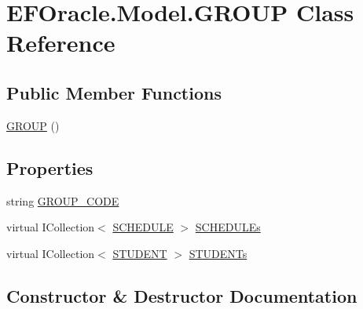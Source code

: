 \hypertarget{class_e_f_oracle_1_1_model_1_1_g_r_o_u_p}{}\section{E\+F\+Oracle.\+Model.\+G\+R\+O\+UP Class Reference}
\label{class_e_f_oracle_1_1_model_1_1_g_r_o_u_p}
\subsection*{Public Member Functions}
\begin{DoxyCompactItemize}
\item 
\hyperlink{class_e_f_oracle_1_1_model_1_1_g_r_o_u_p_aa0b62af3b3c3bdf06d9f4d29a7460015}{G\+R\+O\+UP} ()
\end{DoxyCompactItemize}
\subsection*{Properties}
\begin{DoxyCompactItemize}
\item 
string \hyperlink{class_e_f_oracle_1_1_model_1_1_g_r_o_u_p_a1fef49e133a2bb9843b035a998d5ccd3}{G\+R\+O\+U\+P\+\_\+\+C\+O\+DE}
\item 
virtual I\+Collection$<$ \hyperlink{class_e_f_oracle_1_1_model_1_1_s_c_h_e_d_u_l_e}{S\+C\+H\+E\+D\+U\+LE} $>$ \hyperlink{class_e_f_oracle_1_1_model_1_1_g_r_o_u_p_a4530f4f58596ff43977d5f5f99d7c2a6}{S\+C\+H\+E\+D\+U\+L\+Es}
\item 
virtual I\+Collection$<$ \hyperlink{class_e_f_oracle_1_1_model_1_1_s_t_u_d_e_n_t}{S\+T\+U\+D\+E\+NT} $>$ \hyperlink{class_e_f_oracle_1_1_model_1_1_g_r_o_u_p_af3e5daacb5c988f3b831964cecbaf133}{S\+T\+U\+D\+E\+N\+Ts}
\end{DoxyCompactItemize}


\subsection{Constructor \& Destructor Documentation}
\mbox{\label{class_e_f_oracle_1_1_model_1_1_g_r_o_u_p_aa0b62af3b3c3bdf06d9f4d29a7460015}} 
